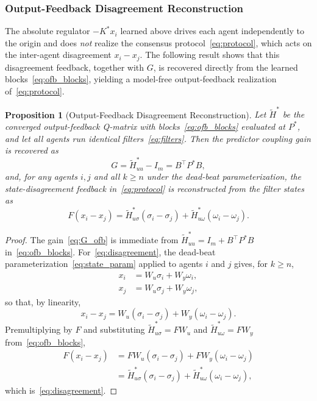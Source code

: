 \documentclass[12pt]{elsarticle}
\newtheorem{proposition}{Proposition}
\theoremstyle{remark}
\begin{document}
\subsubsection{Output-Feedback Disagreement Reconstruction}
\label{subsec:disagreement}
The absolute regulator $-K^*x_i$ learned above drives each agent independently to the origin and does \emph{not} realize the consensus protocol~\eqref{eq:protocol}, which acts on the inter-agent disagreement $x_i - x_j$. The following result shows that this disagreement feedback, together with $G$, is recovered directly from the learned blocks~\eqref{eq:ofb_blocks}, yielding a model-free output-feedback realization of~\eqref{eq:protocol}.
\begin{proposition}[Output-Feedback Disagreement Reconstruction]
\label{prop:disagreement}
Let $\tilde{H}^*$ be the converged output-feedback Q-matrix with blocks~\eqref{eq:ofb_blocks} evaluated at $P^*$, and let all agents run identical filters~\eqref{eq:filters}. Then the predictor coupling gain is recovered as
\begin{equation}
G = \tilde{H}_{uu}^* - I_m = B^\top P^* B,
\label{eq:G_ofb}
\end{equation}
and, for any agents $i,j$ and all $k \geq n$ under the dead-beat parameterization, the state-disagreement feedback in~\eqref{eq:protocol} is reconstructed from the filter states as
\begin{equation}
F(x_i - x_j) = \tilde{H}_{u\sigma}^*(\sigma_i - \sigma_j) + \tilde{H}_{u\omega}^*(\omega_i - \omega_j).
\label{eq:disagreement}
\end{equation}
\end{proposition}
\begin{proof}
The gain~\eqref{eq:G_ofb} is immediate from $\tilde{H}_{uu}^* = I_m + B^\top P^* B$ in~\eqref{eq:ofb_blocks}. For~\eqref{eq:disagreement}, the dead-beat parameterization~\eqref{eq:state_param} applied to agents $i$ and $j$ gives, for $k \geq n$,
\begin{align*}
x_i &= W_u \sigma_i + W_y \omega_i,\\
x_j &= W_u \sigma_j + W_y \omega_j,
\end{align*}
so that, by linearity,
\begin{equation*}
x_i - x_j = W_u(\sigma_i - \sigma_j) + W_y(\omega_i - \omega_j).
\end{equation*}
Premultiplying by $F$ and substituting $\tilde{H}_{u\sigma}^* = F W_u$ and $\tilde{H}_{u\omega}^* = F W_y$ from~\eqref{eq:ofb_blocks},
\begin{align*}
F(x_i - x_j) &= F W_u(\sigma_i - \sigma_j) + F W_y(\omega_i - \omega_j)\\
&= \tilde{H}_{u\sigma}^*(\sigma_i - \sigma_j) + \tilde{H}_{u\omega}^*(\omega_i - \omega_j),
\end{align*}
which is~\eqref{eq:disagreement}.
\end{proof}
\end{document}
